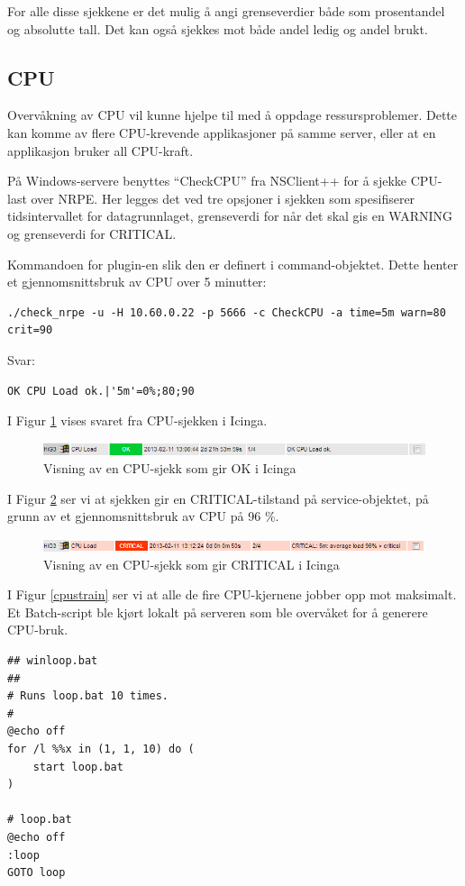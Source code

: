 For alle disse sjekkene er det mulig å angi grenseverdier både som prosentandel og absolutte tall. Det kan også sjekkes mot både andel ledig og andel brukt. 
\subsection{CPU}
Overvåkning av CPU vil kunne hjelpe til med å oppdage ressursproblemer. Dette kan komme av flere CPU-krevende applikasjoner på samme server, eller at en applikasjon bruker all CPU-kraft.  

På Windows-servere benyttes ``CheckCPU'' fra NSClient++ for å sjekke CPU-last over NRPE. Her legges det ved tre opsjoner i sjekken som spesifiserer tidsintervallet for datagrunnlaget, grenseverdi for når det skal gis en WARNING og grenseverdi for CRITICAL.

Kommandoen for plugin-en slik den er definert i command-objektet. Dette henter et gjennomsnittsbruk av CPU over 5 minutter: 
\begin{lstlisting}[style=example]
./check_nrpe -u -H 10.60.0.22 -p 5666 -c CheckCPU -a time=5m warn=80 crit=90
\end{lstlisting}
Svar:
\begin{lstlisting}[style=example]
OK CPU Load ok.|'5m'=0%;80;90
\end{lstlisting}

I Figur \ref{cpuok} vises svaret fra CPU-sjekken i Icinga. 
\begin{figure}[H]
    \centering
    \includegraphics[scale=0.8]{img/HiG3_cpu_ok}
    \caption{Visning av en CPU-sjekk som gir OK i Icinga}
    \label{cpuok}
\end{figure}

I Figur \ref{cpucritical} ser vi at sjekken gir en CRITICAL-tilstand på service-objektet, på grunn av et gjennomsnittsbruk av CPU på 96 \%. 
\begin{figure}[H]
    \centering
    \includegraphics[scale=0.8]{img/HiG3_cpu_critical}
    \caption{Visning av en CPU-sjekk som gir CRITICAL i Icinga}
    \label{cpucritical}
\end{figure}

I Figur \ref{cpustrain} ser vi at alle de fire CPU-kjernene jobber opp mot maksimalt. Et Batch-script ble kjørt lokalt på serveren som ble overvåket for å generere CPU-bruk.
\begin{lstlisting}[style=example]
## winloop.bat
##
# Runs loop.bat 10 times.
#
@echo off
for /l %%x in (1, 1, 10) do (
    start loop.bat
)

# loop.bat
@echo off
:loop
GOTO loop
\end{lstlisting}


